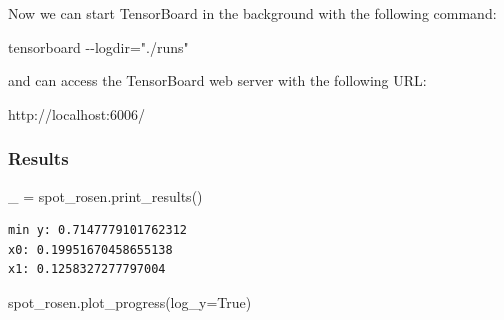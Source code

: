 \documentclass[
  letterpaper,
  DIV=11,
  numbers=noendperiod]{scrreprt}
\newenvironment{Shaded}{\begin{snugshade}}{\end{snugshade}}
\newcommand{\NormalTok}[1]{\textcolor[rgb]{0.00,0.23,0.31}{#1}}
\newcommand{\OperatorTok}[1]{\textcolor[rgb]{0.37,0.37,0.37}{#1}}
\newcommand{\VariableTok}[1]{\textcolor[rgb]{0.07,0.07,0.07}{#1}}
\begin{document}
\begin{tcolorbox}[enhanced jigsaw, rightrule=.15mm, coltitle=black, title=\textcolor{quarto-callout-note-color}{\faInfo}\hspace{0.5em}{Note}, opacitybacktitle=0.6, bottomrule=.15mm, opacityback=0, left=2mm, colback=white, leftrule=.75mm, colframe=quarto-callout-note-color-frame, colbacktitle=quarto-callout-note-color!10!white, toprule=.15mm, toptitle=1mm, bottomtitle=1mm, titlerule=0mm, breakable, arc=.35mm]

Now we can start TensorBoard in the background with the following
command:

\begin{Shaded}
\begin{Highlighting}[]
\NormalTok{tensorboard {-}{-}logdir="./runs"}
\end{Highlighting}
\end{Shaded}

and can access the TensorBoard web server with the following URL:

\begin{Shaded}
\begin{Highlighting}[]
\NormalTok{http://localhost:6006/}
\end{Highlighting}
\end{Shaded}

\end{tcolorbox}

\subsubsection{Results}\label{results-1}

\begin{Shaded}
\begin{Highlighting}[]
\NormalTok{\_ }\OperatorTok{=}\NormalTok{ spot\_rosen.print\_results()}
\end{Highlighting}
\end{Shaded}

\begin{verbatim}
min y: 0.7147779101762312
x0: 0.19951670458655138
x1: 0.1258327277797004
\end{verbatim}

\begin{Shaded}
\begin{Highlighting}[]
\NormalTok{spot\_rosen.plot\_progress(log\_y}\OperatorTok{=}\VariableTok{True}\NormalTok{)}
\end{Highlighting}
\end{Shaded}
\end{document}
